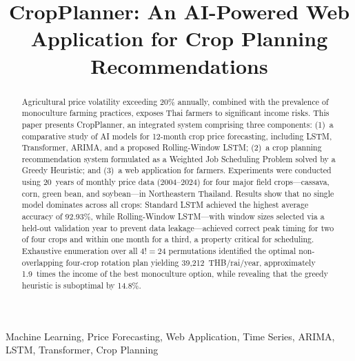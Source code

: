 \documentclass[conference]{IEEEtran}
\begin{document}
\title{CropPlanner: An AI-Powered Web Application for Crop Planning Recommendations}

\author{
}

\maketitle
\thispagestyle{plain}
\pagestyle{plain}

\begin{abstract}
Agricultural price volatility exceeding 20\% annually, combined with the prevalence of monoculture farming practices, exposes Thai farmers to significant income risks. This paper presents CropPlanner, an integrated system comprising three components: (1)~a comparative study of AI models for 12-month crop price forecasting, including LSTM, Transformer, ARIMA, and a proposed Rolling-Window LSTM; (2)~a crop planning recommendation system formulated as a Weighted Job Scheduling Problem solved by a Greedy Heuristic; and (3)~a web application for farmers. Experiments were conducted using 20~years of monthly price data (2004--2024) for four major field crops---cassava, corn, green bean, and soybean---in Northeastern Thailand. Results show that no single model dominates across all crops: Standard LSTM achieved the highest average accuracy of 92.93\%, while Rolling-Window LSTM---with window sizes selected via a held-out validation year to prevent data leakage---achieved correct peak timing for two of four crops and within one month for a third, a property critical for scheduling. Exhaustive enumeration over all $4! = 24$ permutations identified the optimal non-overlapping four-crop rotation plan yielding 39,212~THB/rai/year, approximately 1.9~times the income of the best monoculture option, while revealing that the greedy heuristic is suboptimal by 14.8\%.
\end{abstract}

\begin{IEEEkeywords}
Machine Learning, Price Forecasting, Web Application, Time Series, ARIMA, LSTM, Transformer, Crop Planning
\end{IEEEkeywords}
\end{document}

